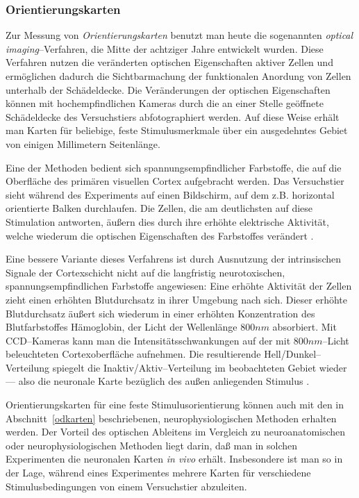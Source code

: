 \subsubsection{Orientierungskarten}

Zur Messung von \emph{Orientierungskarten} benutzt man heute die
sogenannten \emph{optical imaging}--Verfahren, die Mitte der achtziger
Jahre entwickelt wurden. Diese Verfahren nutzen die veränderten optischen
Eigenschaften aktiver Zellen und ermöglichen dadurch die Sichtbarmachung
der funktionalen Anordung von Zellen unterhalb der Schädeldecke. Die
Veränderungen der optischen Eigenschaften können mit hochempfindlichen
Kameras durch die an einer Stelle geöffnete Schädeldecke des
Versuchstiers abfotographiert werden. Auf diese Weise erhält man Karten
für beliebige, feste Stimulusmerkmale über ein ausgedehntes Gebiet von
einigen Millimetern Seitenlänge.

Eine der Methoden bedient sich spannungsempfindlicher Farbstoffe, die auf
die Oberfläche des primären visuellen Cortex aufgebracht werden. Das
Versuchstier sieht während des Experiments auf einen Bildschirm, auf dem
z.B. horizontal orientierte Balken durchlaufen. Die Zellen, die am
deutlichsten auf diese Stimulation antworten, äußern dies durch ihre
erhöhte elektrische Aktivität, welche wiederum die optischen
Eigenschaften des Farbstoffes verändert \cite{blasdel:1986,blasdel:1992a}.

Eine bessere Variante dieses Verfahrens ist durch Ausnutzung der
intrinsischen Signale der Cortexschicht nicht auf die langfristig
neurotoxischen, spannungsempfindlichen Farbstoffe angewiesen: Eine erhöhte
Aktivität der Zellen zieht einen erhöhten Blutdurchsatz in ihrer Umgebung
nach sich. Dieser erhöhte Blutdurchsatz äußert sich wiederum in einer
erhöhten Konzentration des Blutfarbstoffes Hämoglobin, der Licht der
Wellenlänge $800nm$ absorbiert. Mit CCD--Kameras kann man die
Intensitätsschwankungen auf der mit $800nm$--Licht beleuchteten
Cortexoberfläche aufnehmen. Die resultierende Hell/Dunkel--Verteilung
spiegelt die Inaktiv/Aktiv--Verteilung im beobachteten Gebiet wieder ---
also die neuronale Karte bezüglich des außen anliegenden Stimulus
\cite{lieke:1989,grinvald:1991}.

Orientierungskarten für eine feste Stimulusorientierung können auch mit
den in Abschnitt~\ref{odkarten} beschriebenen, neurophysiologischen
Methoden erhalten werden. Der Vorteil des optischen Ableitens im Vergleich
zu neuroanatomischen oder neurophysiologischen Methoden liegt darin, daß
man in solchen Experimenten die neuronalen Karten \emph{in vivo}
erhält. Insbesondere ist man so in der Lage, während eines Experimentes
mehrere Karten für verschiedene Stimulusbedingungen von einem Versuchstier
abzuleiten.

